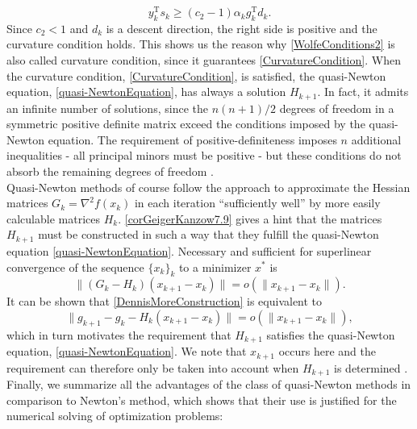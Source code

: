 \begin{equation}\label{CurvatureConditionWolfe}
    y^{\mathrm{T}}_k s_k \geq (c_2 - 1) \alpha_k g^{\mathrm{T}}_k d_k.
\end{equation}
Since $c_2 < 1$ and $d_k$ is a descent direction, the right side is positive and the curvature condition holds. This shows us the reason why \cref{WolfeConditions2} is also called curvature condition, since it guarantees \cref{CurvatureCondition}. When the curvature condition, \cref{CurvatureCondition}, is satisfied, the quasi-Newton equation, \cref{quasi-NewtonEquation}, has always a solution $H_{k+1}$. In fact, it admits an infinite number of solutions, since the $n(n+1)/2$ degrees of freedom in a symmetric positive definite matrix exceed the conditions imposed by the quasi-Newton equation. The requirement of positive-definiteness imposes $n$ additional inequalities - all principal minors must be positive - but these conditions do not absorb the remaining degrees of freedom \cite[p.~138]{NocedalWright:2006}. \\
Quasi-Newton methods of course follow the approach to approximate the Hessian matrices $G_k = \nabla^2 f(x_k)$ in each iteration “sufficiently well” by more easily calculable matrices $H_k$. \cref{corGeigerKanzow7.9} gives a hint that the matrices $H_{k+1}$ must be constructed in such a way that they fulfill the quasi-Newton equation \cref{quasi-NewtonEquation}. Necessary and sufficient for superlinear convergence of the sequence $\{x_k\}_k$ to a minimizer $x^*$ is 
\begin{equation}\label{DennisMoreConstruction}
    \lVert (G_k - H_k)(x_{k+1} - x_k) \rVert = o( \lVert x_{k+1}-x_k \rVert ).
\end{equation}
It can be shown that \cref{DennisMoreConstruction} is equivalent to 
\begin{equation*}
    \lVert g_{k+1} - g_k - H_k (x_{k+1} - x_k) \rVert = o( \lVert x_{k+1}-x_k \rVert ),
\end{equation*}
which in turn motivates the requirement that $H_{k+1}$ satisfies the quasi-Newton equation, \cref{quasi-NewtonEquation}. We note that $x_{k+1}$ occurs here and the requirement can therefore only be taken into account when $H_{k+1}$ is determined \cite[p.~129-130]{GeigerKanzow:1999}. \\
Finally, we summarize all the advantages of the class of quasi-Newton methods in comparison to Newton's method, which shows that their use is justified for the numerical solving of optimization problems: \\

